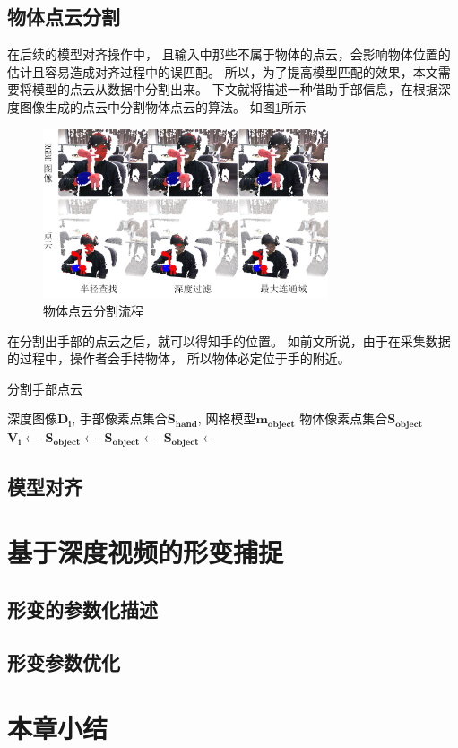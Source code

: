 \subsection{物体点云分割}
在后续的模型对齐操作中，
且输入中那些不属于物体的点云，会影响物体位置的估计且容易造成对齐过程中的误匹配。
所以，为了提高模型匹配的效果，本文需要将模型的点云从数据中分割出来。
下文就将描述一种借助手部信息，在根据深度图像生成的点云中分割物体点云的算法。
如图\ref{finding_object}所示
\begin{figure}[ht]
    \centering
    \includegraphics[width = 0.75\textwidth]{./Pictures/FindingObj.png}
    \caption{物体点云分割流程}
    \label{finding_object}
\end{figure}

在分割出手部的点云之后，就可以得知手的位置。
如前文所说，由于在采集数据的过程中，操作者会手持物体，
所以物体必定位于手的附近。
\begin{algorithm}
    \fangsong
    \caption{分割手部点云}
    \label{alg_seg_obj}
    \begin{algorithmic}[1]
        \Require 深度图像$\mathbf{D_i}$, 手部像素点集合$\mathbf{S_{hand}}$, 网格模型$\mathbf{m_{object}}$
        \Ensure 物体像素点集合$\mathbf{S_{object}}$
            \State $\mathbf{V_i} \gets$ 
            \State $\mathbf{S_{object}} \gets$ 
            \State $\mathbf{S_{object}} \gets$ 
            \State $\mathbf{S_{object}} \gets$ 
        \EndProcedure
        
    \end{algorithmic}
\end{algorithm}

\subsection{模型对齐}

\section{基于深度视频的形变捕捉}
\subsection{形变的参数化描述}
\subsection{形变参数优化}

\section{本章小结}